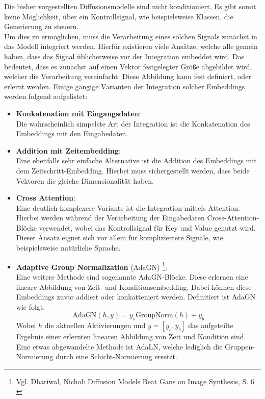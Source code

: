 Die bisher vorgestellten Diffusionsmodelle sind nicht konditioniert. Es gibt somit keine Möglichkeit, über ein Kontrollsignal, wie beispielsweise Klassen, die Generierung zu steuern. \\
Um dies zu ermöglichen, muss die Verarbeitung eines solchen Signals zunächst in das Modell integriert werden. Hierfür existieren viele Ansätze, welche alle gemein haben, dass das Signal üblicherweise vor der Integration embeddet wird. Das bedeutet, dass es zunächst auf einen Vektor festgelegter Größe abgebildet wird, welcher die Verarbeitung vereinfacht. Diese Abbildung kann fest definiert, oder erlernt werden. Einige gängige Varianten der Integration solcher Embeddings werden folgend aufgelistet:
\begin {itemize}
    \item \textbf{Konkatenation mit Eingangsdaten}: \\
    Die wahrscheinlich simpelste Art der Integration ist die Konkatenation des Embeddings mit den Eingabedaten.
    \item \textbf{Addition mit Zeitembedding}: \\
    Eine ebenfalls sehr einfache Alternative ist die Addition des Embeddings mit dem Zeitschritt-Embedding. Hierbei muss sichergestellt werden, dass beide Vektoren die gleiche Dimensionalität haben.
    \item \textbf{Cross Attention}: \\
    Eine deutlich komplexere Variante ist die Integration mittels Attention. Hierbei werden während der Verarbeitung der Eingabedaten Cross-Attention-Blöcke verwendet, wobei das Kontrollsignal für Key und Value genutzt wird. Dieser Ansatz eignet sich vor allem für kompliziertere Signale, wie beispielsweise natürliche Sprache.
    \item \textbf{Adaptive Group Normalization} (AdaGN) \footnote{
        Vgl. Dhariwal, Nichol: Diffusion Models Beat Gans on Image Synthesis, S. 6
        \cite{NEURIPS2021_49ad23d1}
    }: \\
    Eine weitere Methode sind sogenannte \ac{AdaGN}-Blöcke. Diese erlernen eine lineare Abbildung von Zeit- und Konditionsembedding. Dabei können diese Embeddings zuvor addiert oder konkatteniert werden. Definitiert ist \ac{AdaGN} wie folgt:
    \begin{equation}
        \text{AdaGN}(h,y) = y_s \text{GroupNorm}(h) + y_b
    \end{equation}
    Wobei $h$ die aktuellen Aktivierungen und $y=[y_s, y_b]$ das aufgeteilte Ergebnis einer erlernten linearen Abbildung von Zeit und Kondition sind. \\
    Eine etwas abgewandelte Methode ist \ac{AdaLN}, welche lediglich die Gruppen-Normierung durch eine Schicht-Normierung ersetzt.    
\end {itemize}  
